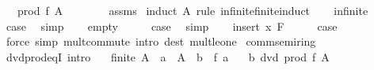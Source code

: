 \begin{isabellebody}
\ \ \ {\isachardoublequoteopen}prod\ f\ A\ {\isasymle}\ {}{\isachardoublequoteclose}\isanewline
%
\isadelimproof
\ \ \ \ %
\endisadelimproof
%
\isatagproof
{}\isamarkupfalse%
\ assms\isanewline
{}\isamarkupfalse%
\ {\isacharparenleft}{\kern0pt}induct\ A\ rule{\isacharcolon}{\kern0pt}\ infinite{\isacharunderscore}{\kern0pt}finite{\isacharunderscore}{\kern0pt}induct{\isacharparenright}{\kern0pt}\isanewline
\ \ \isamarkupfalse%
\ infinite\isanewline
\ \ \isamarkupfalse%
\ \isamarkupfalse%
\ {\isacharquery}{\kern0pt}case\ \isamarkupfalse%
\ simp\isanewline
{}\isamarkupfalse%
\isanewline
\ \ \isamarkupfalse%
\ empty\isanewline
\ \ \isamarkupfalse%
\ \isamarkupfalse%
\ {\isacharquery}{\kern0pt}case\ \isamarkupfalse%
\ simp\isanewline
{}\isamarkupfalse%
\isanewline
\ \ \isamarkupfalse%
\ {\isacharparenleft}{\kern0pt}insert\ x\ F{\isacharparenright}{\kern0pt}\isanewline
\ \ \isamarkupfalse%
\ \isamarkupfalse%
\ {\isacharquery}{\kern0pt}case\ \isamarkupfalse%
\ {\isacharparenleft}{\kern0pt}force\ simp{\isacharcolon}{\kern0pt}\ mult{\isachardot}{\kern0pt}commute\ intro{\isacharcolon}{\kern0pt}\ dest{\isacharcolon}{\kern0pt}\ mult{\isacharunderscore}{\kern0pt}le{\isacharunderscore}{\kern0pt}one{\isacharparenright}{\kern0pt}\isanewline
{}\isamarkupfalse%
%
\endisatagproof
{\isafoldproof}%
%
\isadelimproof
\isanewline
%
\endisadelimproof
\isanewline
{}\isamarkupfalse%
\isanewline
\isanewline
{}\isamarkupfalse%
\ comm{\isacharunderscore}{\kern0pt}semiring{\isacharunderscore}{\kern0pt}{}\isanewline
{}\isanewline
\isanewline
{}\isamarkupfalse%
\ dvd{\isacharunderscore}{\kern0pt}prod{\isacharunderscore}{\kern0pt}eqI\ {\isacharbrackleft}{\kern0pt}intro{\isacharbrackright}{\kern0pt}{\isacharcolon}{\kern0pt}\isanewline
\ \ \ {\isachardoublequoteopen}finite\ A{\isachardoublequoteclose}\ \ {\isachardoublequoteopen}a\ {\isasymin}\ A{\isachardoublequoteclose}\ \ {\isachardoublequoteopen}b\ {\isacharequal}{\kern0pt}\ f\ a{\isachardoublequoteclose}\isanewline
\ \ \ {\isachardoublequoteopen}b\ dvd\ prod\ f\ A{\isachardoublequoteclose}\isanewline
%
\isadelimproof
%
\endisadelimproof
%
\isatagproof
{}\isamarkupfalse%
\ {\isacharminus}{\kern0pt}\isanewline

\end{isabellebody}

